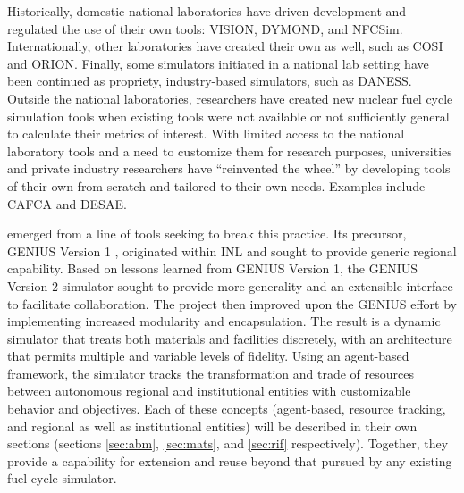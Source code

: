 Historically, domestic national laboratories have driven development and
regulated the use of their own tools:
\gls{VISION}\cite{jacobson_verifiable_2010},
\gls{DYMOND}\cite{yacout_modeling_2005}, and
\gls{NFCSim}\cite{schneider_nfcsim:_2005,allan_guidance_2008}.  Internationally,
other laboratories have created their own as well, such as
\gls{COSI}\cite{boucher_cosi_2005,boucher_cosi:_2006,meyer_new_2009,coquelet-pascal_comparison_2011}
and ORION\cite{worrall_scenario_2007}.  Finally, some simulators initiated in a national lab setting have
been continued as propriety, industry-based simulators, such as
\gls{DANESS}\cite{van_den_durpel_daness_2009}.  Outside the national laboratories,
researchers have created new nuclear fuel cycle simulation tools when existing
tools were not available or not sufficiently general to calculate their metrics
of interest.  With limited access to the
national laboratory tools and a need to customize them for research purposes,
universities and private industry researchers have ``reinvented the wheel'' by
developing tools of their own from scratch and tailored to their own needs.
Examples include \gls{CAFCA}\cite{guerin_benchmark_2009} and
\gls{DESAE}\cite{andrianova_desae_2008,mccarthy_benchmark_2012,allan_guidance_2008}.

\Cyclus emerged from a line of tools seeking to break this practice.  Its
precursor, \gls{GENIUS} Version 1
\cite{dunzik-gougar_global_2007,jain_transitioning_2006}, originated within
\gls{INL} and sought to provide generic regional capability.  Based on lessons
learned from \gls{GENIUS} Version 1, the \gls{GENIUS} Version 2
\cite{oliver_studying_2009,huff_geniusv2_2009} simulator sought to provide more
generality and an extensible interface to facilitate collaboration.  The \Cyclus
project then improved upon the \gls{GENIUS} effort by implementing increased
modularity and encapsulation.  The result is a dynamic simulator that treats
both materials and facilities discretely, with an architecture that permits
multiple and variable levels of fidelity. Using an agent-based framework, the
simulator tracks the transformation and trade of resources between autonomous
regional and institutional entities with customizable behavior and
objectives. Each of these concepts (agent-based, resource tracking, and
regional as well as institutional entities) will be described in their own
sections (sections \ref{sec:abm}, \ref{sec:mats}, and \ref{sec:rif}
respectively).  Together, they provide a capability for extension and reuse
beyond that pursued by any existing fuel cycle simulator.



